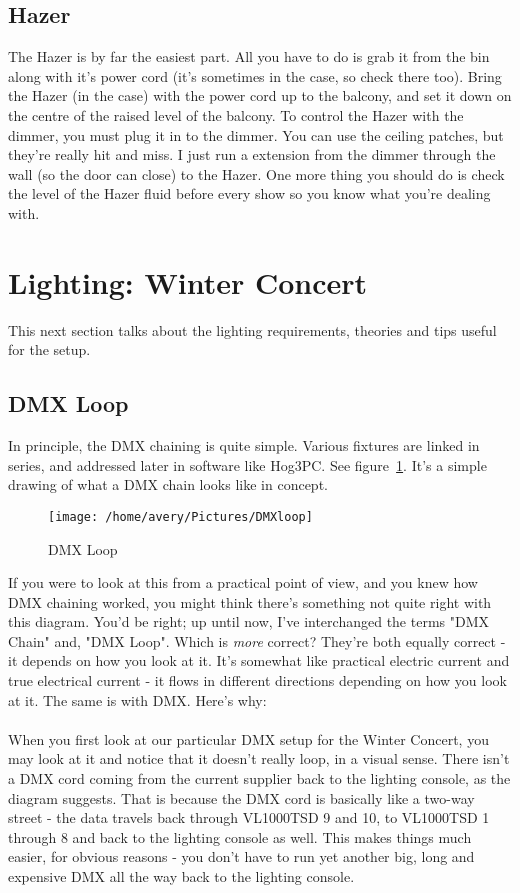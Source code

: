 \documentclass[11pt,a4paper]{book}
\begin{document}
\subsection{Hazer}
The Hazer is by far the easiest part. All you have to do is grab it from the bin along with it's power cord (it's sometimes in the case, so check there too). Bring the Hazer (in the case) with the power cord up to the balcony, and set it down on the centre of the raised level of the balcony. To control the Hazer with the dimmer, you must plug it in to the dimmer. You can use the ceiling patches, but they're really hit and miss. I just run a extension from the dimmer through the wall (so the door can close) to the Hazer. One more thing you should do is check the level of the Hazer fluid before every show so you know what you're dealing with.
\section{Lighting: Winter Concert}
This next section talks about the lighting requirements, theories and tips useful for the setup.
\subsection{DMX Loop}
In principle, the DMX chaining is quite simple. Various fixtures are linked in series, and addressed later in software like Hog3PC. See figure~\ref{DMXloop}. It's a simple drawing of what a DMX chain looks like in concept.
\begin{figure}[h]
\label{DMXloop}
\texttt{[image: /home/avery/Pictures/DMXloop]} 
\caption{DMX Loop}
\end{figure}
If you were to look at this from a practical point of view, and you knew how DMX chaining worked, you might think there's something not quite right with this diagram. You'd be right; up until now, I've interchanged the terms "DMX Chain" and, "DMX Loop". Which is \textit{more} correct? They're both equally correct - it depends on how you look at it. It's somewhat like practical electric current and true electrical current - it flows in different directions depending on how you look at it. The same is with DMX. Here's why:
\\
\\
When you first look at our particular DMX setup for the Winter Concert, you may look at it and notice that it doesn't really loop, in a visual sense. There isn't a DMX cord coming from the current supplier back to the lighting console, as the diagram suggests. That is because the DMX cord is basically like a two-way street - the data travels back through VL1000TSD 9 and 10, to VL1000TSD 1 through 8 and back to the lighting console as well. This makes things much easier, for obvious reasons - you don't have to run yet another big, long and expensive DMX all the way back to the lighting console.  
\end{document}
